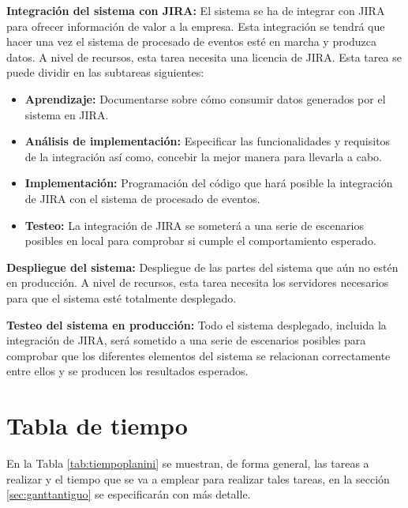 \textbf{Integración del sistema con JIRA:} El sistema se ha de integrar con JIRA para ofrecer información de valor a la empresa. Esta integración se tendrá que hacer una vez el sistema de procesado de eventos esté en marcha y produzca datos. A nivel de recursos, esta tarea necesita una licencia de JIRA. Esta tarea se puede dividir en las subtareas siguientes:
\begin{itemize}
	
	\item \textbf{Aprendizaje:} Documentarse sobre cómo consumir datos generados por el sistema en JIRA.
	
	\item \textbf{Análisis de implementación:} Especificar las funcionalidades y requisitos de la integración así como, concebir la mejor manera para llevarla a cabo.
	
	\item \textbf{Implementación:} Programación del código que hará posible la integración de JIRA con el sistema de procesado de eventos.
	
	\item \textbf{Testeo:} La integración de JIRA se someterá a una serie de escenarios posibles en local para comprobar si cumple el comportamiento esperado.
	
\end{itemize}

\textbf{Despliegue del sistema:} Despliegue de las partes del sistema que aún no estén en producción. A nivel de recursos, esta tarea necesita los servidores necesarios para que el sistema esté totalmente desplegado.

\textbf{Testeo del sistema en producción:} Todo el sistema desplegado, incluida la integración de JIRA, será sometido a una serie de escenarios posibles para comprobar que los diferentes elementos del sistema se relacionan correctamente entre ellos y se producen los resultados esperados.

\section{Tabla de tiempo}
En la Tabla \ref{tab:tiempoplanini} se muestran, de forma general, las tareas a realizar y el tiempo que se va a emplear para realizar tales tareas, en la sección \ref{sec:ganttantiguo} se especificarán con más detalle.

